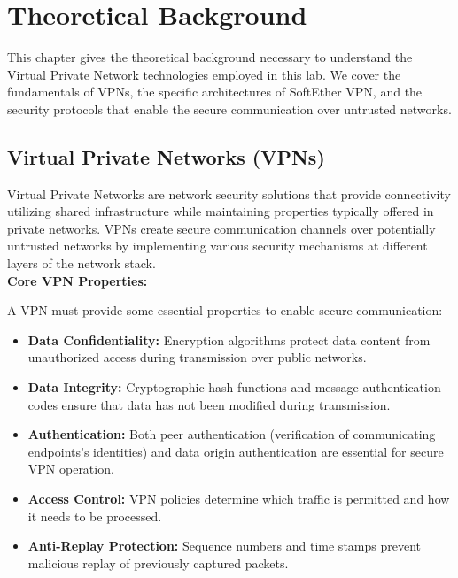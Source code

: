 \newpage

\section{Theoretical Background}

This chapter gives the theoretical background necessary to understand the Virtual Private Network technologies employed in this lab. We cover the fundamentals of VPNs, the specific architectures of SoftEther VPN, and the security protocols that enable the secure communication over untrusted networks.

\subsection{Virtual Private Networks (VPNs)}

Virtual Private Networks are network security solutions that provide connectivity utilizing shared infrastructure while maintaining properties typically offered in private networks. VPNs create secure communication channels over potentially untrusted networks by implementing various security mechanisms at different layers of the network stack.\\

\noindent
\textbf{Core VPN Properties:}

\noindent
A VPN must provide some essential properties to enable secure communication:

\begin{itemize}
    \item \textbf{Data Confidentiality:} Encryption algorithms protect data content from unauthorized access during transmission over public networks.
    
    \item \textbf{Data Integrity:} Cryptographic hash functions and message authentication codes ensure that data has not been modified during transmission.
    
    \item \textbf{Authentication:} Both peer authentication (verification of communicating endpoints's identities) and data origin authentication are essential for secure VPN operation.
    
    \item \textbf{Access Control:} VPN policies determine which traffic is permitted and how it needs to be processed.
    
    \item \textbf{Anti-Replay Protection:} Sequence numbers and time stamps prevent malicious replay of previously captured packets.
\end{itemize}

